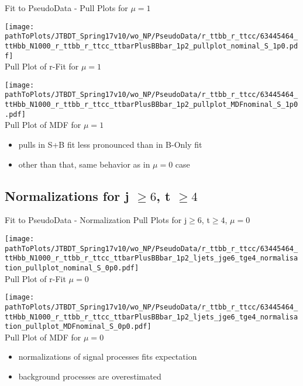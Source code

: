 \begin{frame}{Fit to PseudoData - Pull Plots for $\mu = 1$}

\begin{minipage}{0.44\textwidth}
\centering
\texttt{[image: \\pathToPlots/JTBDT\_Spring17v10/wo\_NP/PseudoData/r\_ttbb\_r\_ttcc/63445464\_ttHbb\_N1000\_r\_ttbb\_r\_ttcc\_ttbarPlusBBbar\_1p2\_pullplot\_nominal\_S\_1p0.pdf]}\\
Pull Plot of r-Fit for $\mu = 1$

\end{minipage}
\hfill
\begin{minipage}{0.44\textwidth}
\centering
\texttt{[image: \\pathToPlots/JTBDT\_Spring17v10/wo\_NP/PseudoData/r\_ttbb\_r\_ttcc/63445464\_ttHbb\_N1000\_r\_ttbb\_r\_ttcc\_ttbarPlusBBbar\_1p2\_pullplot\_MDFnominal\_S\_1p0.pdf]}\\
Pull Plot of MDF for $\mu = 1$

\end{minipage}
\begin{itemize}
\item pulls in S+B fit less pronounced than in B-Only fit
\item other than that, same behavior as in $\mu = 0$ case
\end{itemize}
\end{frame}

\subsection{Normalizations for j $\geq 6$, t $\geq 4$}

\begin{frame}{Fit to PseudoData - Normalization Pull Plots for j$\geq 6$, t$\geq 4$, $\mu = 0$}

\begin{minipage}{0.44\textwidth}
\centering
\texttt{[image: \\pathToPlots/JTBDT\_Spring17v10/wo\_NP/PseudoData/r\_ttbb\_r\_ttcc/63445464\_ttHbb\_N1000\_r\_ttbb\_r\_ttcc\_ttbarPlusBBbar\_1p2\_ljets\_jge6\_tge4\_normalisation\_pullplot\_nominal\_S\_0p0.pdf]}\\
Pull Plot of r-Fit $\mu = 0$

\end{minipage}
\hfill
\begin{minipage}{0.44\textwidth}
\centering
\texttt{[image: \\pathToPlots/JTBDT\_Spring17v10/wo\_NP/PseudoData/r\_ttbb\_r\_ttcc/63445464\_ttHbb\_N1000\_r\_ttbb\_r\_ttcc\_ttbarPlusBBbar\_1p2\_ljets\_jge6\_tge4\_normalisation\_pullplot\_MDFnominal\_S\_0p0.pdf]}\\
Pull Plot of MDF for $\mu = 0$

\end{minipage}
\begin{itemize}
\item normalizations of signal processes fits expectation
\item background processes are overestimated
\end{itemize}
\end{frame}

